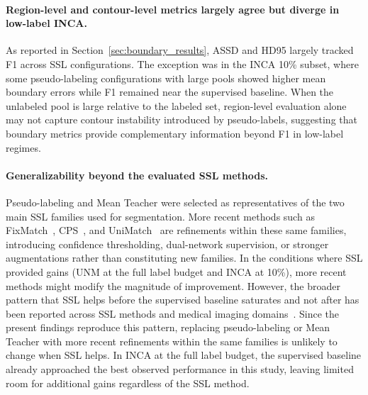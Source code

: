 \documentclass[a4paper,fleqn]{cas-dc}
\begin{document}
\paragraph{Region-level and contour-level metrics largely agree but diverge in low-label INCA.}
As reported in Section~\ref{sec:boundary_results}, ASSD and HD95 largely tracked F1 across SSL configurations. The exception was in the INCA 10\% subset, where some pseudo-labeling configurations with large pools showed higher mean boundary errors while F1 remained near the supervised baseline. When the unlabeled pool is large relative to the labeled set, region-level evaluation alone may not capture contour instability introduced by pseudo-labels, suggesting that boundary metrics provide complementary information beyond F1 in low-label regimes.

\paragraph{Generalizability beyond the evaluated SSL methods.}
Pseudo-labeling and Mean Teacher were selected as representatives of the two main SSL families used for segmentation. More recent methods such as FixMatch~\citep{ref_fixmatch}, CPS~\citep{ref_cps}, and UniMatch~\citep{ref_yang2023} are refinements within these same families, introducing confidence thresholding, dual-network supervision, or stronger augmentations rather than constituting new families. In the conditions where SSL provided gains (UNM at the full label budget and INCA at 10\%), more recent methods might modify the magnitude of improvement. However, the broader pattern that SSL helps before the supervised baseline saturates and not after has been reported across SSL methods and medical imaging domains~\citep{ref_oliver2018,ref_fu2019}. Since the present findings reproduce this pattern, replacing pseudo-labeling or Mean Teacher with more recent refinements within the same families is unlikely to change when SSL helps. In INCA at the full label budget, the supervised baseline already approached the best observed performance in this study, leaving limited room for additional gains regardless of the SSL method.
\end{document}
